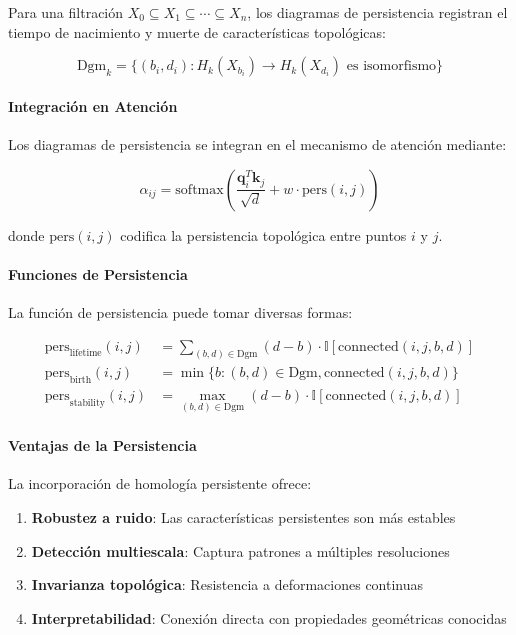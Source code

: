 Para una filtración $X_0 \subseteq X_1 \subseteq \cdots \subseteq X_n$, los diagramas de persistencia registran el tiempo de nacimiento y muerte de características topológicas:

\begin{equation}
\text{Dgm}_k = \{(b_i, d_i) : H_k(X_{b_i}) \to H_k(X_{d_i}) \text{ es isomorfismo}\}
\label{eq:persistence_diagram}
\end{equation}

\paragraph{Integración en Atención}

Los diagramas de persistencia se integran en el mecanismo de atención mediante:

\begin{equation}
\alpha_{ij} = \text{softmax}\left(\frac{\mathbf{q}_i^T \mathbf{k}_j}{\sqrt{d}} + w \cdot \text{pers}(i,j)\right)
\label{eq:persistent_attention_weights}
\end{equation}

donde $\text{pers}(i,j)$ codifica la persistencia topológica entre puntos $i$ y $j$.

\paragraph{Funciones de Persistencia}

La función de persistencia puede tomar diversas formas:

\begin{align}
\text{pers}_{\text{lifetime}}(i,j) &= \sum_{(b,d) \in \text{Dgm}} (d-b) \cdot \mathbb{I}[\text{connected}(i,j,b,d)] \label{eq:lifetime_persistence} \\
\text{pers}_{\text{birth}}(i,j) &= \min\{b : (b,d) \in \text{Dgm}, \text{connected}(i,j,b,d)\} \\
\text{pers}_{\text{stability}}(i,j) &= \max_{(b,d) \in \text{Dgm}} (d-b) \cdot \mathbb{I}[\text{connected}(i,j,b,d)]
\end{align}

\paragraph{Ventajas de la Persistencia}

La incorporación de homología persistente ofrece:

\begin{enumerate}
    \item \textbf{Robustez a ruido}: Las características persistentes son más estables
    \item \textbf{Detección multiescala}: Captura patrones a múltiples resoluciones
    \item \textbf{Invarianza topológica}: Resistencia a deformaciones continuas
    \item \textbf{Interpretabilidad}: Conexión directa con propiedades geométricas conocidas
\end{enumerate}

